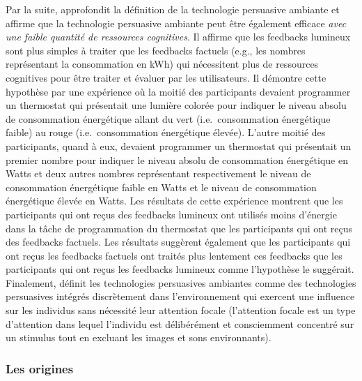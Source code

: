 \documentclass[10pt,a5paper,twoside]{article}
\begin{document}
Par la suite, \citet{ham2010ambient} approfondit la définition de la
technologie persuasive ambiante et affirme que la technologie persuasive
ambiante peut être également efficace \emph{avec une faible quantité de
ressources cognitives}. Il affirme que les feedbacks lumineux sont plus
simples à traiter que les feedbacks factuels (e.g., les nombres
représentant la consommation en kWh) qui nécessitent plus de ressources
cognitives pour être traiter et évaluer par les utilisateurs. Il
démontre cette hypothèse par une expérience où la moitié des
participants devaient programmer un thermostat qui présentait une
lumière colorée pour indiquer le niveau absolu de consommation
énergétique allant du vert (i.e.~consommation énergétique faible) au
rouge (i.e.~consommation énergétique élevée). L'autre moitié des
participants, quand à eux, devaient programmer un thermostat qui
présentait un premier nombre pour indiquer le niveau absolu de
consommation énergétique en Watts et deux autres nombres représentant
respectivement le niveau de consommation énergétique faible en Watts et
le niveau de consommation énergétique élevée en Watts. Les résultats de
cette expérience montrent que les participants qui ont reçus des
feedbacks lumineux ont utilisés moins d'énergie dans la tâche de
programmation du thermostat que les participants qui ont reçus des
feedbacks factuels. Les résultats suggèrent également que les
participants qui ont reçus les feedbacks factuels ont traités plus
lentement ces feedbacks que les participants qui ont reçus les feedbacks
lumineux comme l'hypothèse le suggérait. Finalement,
\citet{ham2010ambient} définit les technologies persuasives ambiantes
comme des technologies persuasives intégrés discrètement dans
l'environnement qui exercent une influence sur les individus sans
nécessité leur attention focale (l'attention focale est un type
d'attention dans lequel l'individu est délibérément et consciemment
concentré sur un stimulus tout en excluant les images et sons
environnants).

\subsubsection{Les origines}\label{les-origines-1}
\end{document}
